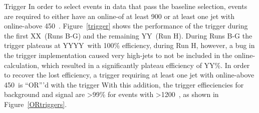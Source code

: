\begin{section}{Trigger}
In order to select events in data that pass the baseline selection, events are required to either have an online-\HT of at least 900 \GeV or at least one jet with online-\pT above 450~\GeV.
Figure~\ref{trigger} shows the performance of the trigger during the first XX~\ifb (Runs B-G) and the remaining YY~\ifb (Run H).
During Runs B-G the trigger plateaus at YYYY~\GeV with 100\% efficiency, during Run H, however, a bug in the trigger implementation caused very high-\pT jets to not be included in the online-\HT calculation, which resulted in a significantly plateau efficiency of YY\%.
In order to recover the lost efficiency, a trigger requiring at least one jet with online-\pT above 450~\GeV is ``OR'''d with the \HT trigger
With this addition, the trigger effieciencies for background and signal are >99\% for events with \HT>1200~\GeV, as shown in Figure~\ref{ORtriggers}.

\end{section}

